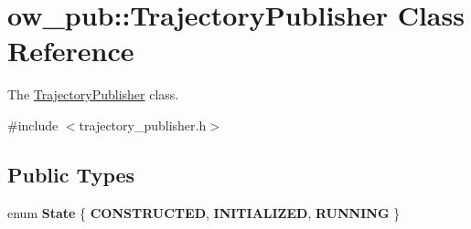 \hypertarget{classow__pub_1_1TrajectoryPublisher}{}\section{ow\+\_\+pub\+:\+:Trajectory\+Publisher Class Reference}
\label{classow__pub_1_1TrajectoryPublisher}


The \hyperlink{classow__pub_1_1TrajectoryPublisher}{Trajectory\+Publisher} class.  




{\ttfamily \#include $<$trajectory\+\_\+publisher.\+h$>$}

\subsection*{Public Types}
\begin{DoxyCompactItemize}
\item 
enum {\bfseries State} \{ {\bfseries C\+O\+N\+S\+T\+R\+U\+C\+T\+ED}, 
{\bfseries I\+N\+I\+T\+I\+A\+L\+I\+Z\+ED}, 
{\bfseries R\+U\+N\+N\+I\+NG}
 \}\hypertarget{classow__pub_1_1TrajectoryPublisher_a21264fa772939aee4a69f83ded864264}{}\label{classow__pub_1_1TrajectoryPublisher_a21264fa772939aee4a69f83ded864264}

\end{DoxyCompactItemize}
